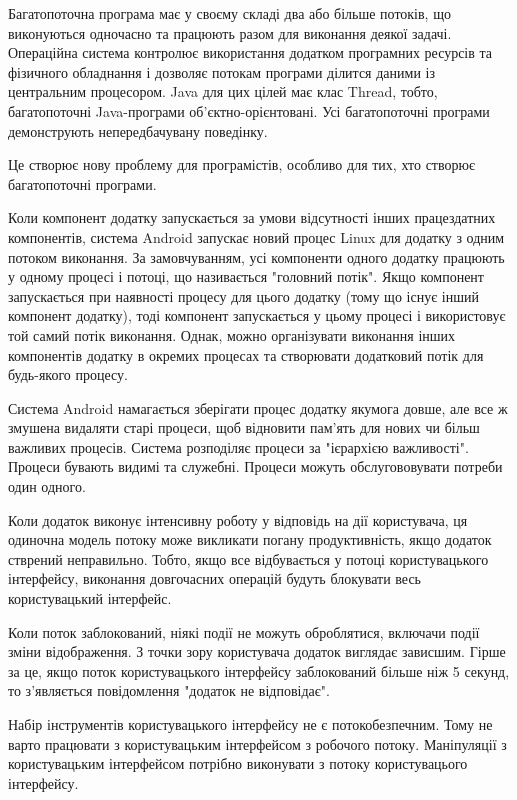 Багатопоточна програма має у своєму складі два або більше потоків, що виконуються одночасно та працюють разом для виконання деякої задачі. Операційна система контролює використання додатком програмних ресурсів та фізичного обладнання і дозволяє потокам програми ділится даними із центральним процесором. Java для цих цілей має клас Thread, тобто, багатопоточні Java-програми об'єктно-орієнтовані. Усі багатопоточні програми демонструють непередбачувану поведінку.

Це створює нову проблему для програмістів, особливо для тих, хто створює багатопоточні програми. \cite{carver2005modern}

Коли компонент додатку запускається за умови відсутності інших працездатних компонентів, система Android запускає новий процес Linux для додатку з одним потоком виконання. За замовчуванням, усі компоненти одного додатку працюють у одному процесі і потоці, що називається "головний потік". Якщо компонент запускається при наявності процесу для цього додатку (тому що існує інший компонент додатку), тоді компонент запускається у цьому процесі і використовує той самий потік виконання. Однак, можно організувати виконання інших компонентів додатку в окремих процесах та створювати додатковий потік для будь-якого процесу.

Система Android намагається зберігати процес додатку якумога довше, але все ж змушена видаляти старі процеси, щоб відновити пам'ять для нових чи більш важливих процесів. Система розподіляє процеси за "ієрархією важливості". Процеси бувають видимі та служебні. Процеси можуть обслугововувати потреби один одного.

Коли додаток виконує інтенсивну роботу у відповідь на дії користувача, ця одиночна модель потоку може викликати погану продуктивність, якщо додаток стврений неправильно. Тобто, якщо все відбувається у потоці користувацького інтерфейсу, виконання довгочасних операцій будуть блокувати весь користувацький інтерфейс.

Коли поток заблокований, ніякі події не можуть оброблятися, включачи події зміни відображення. З точки зору користувача додаток виглядає зависшим. Гірше за це, якщо поток користувацького інтерфейсу заблокований більше ніж 5 секунд, то з'являється повідомлення "додаток не відповідає".

Набір інструментів користувацького інтерфейсу не є потокобезпечним. Тому не варто працювати з користувацьким інтерфейсом з робочого потоку. Маніпуляції з користувацьким інтерфейсом потрібно виконувати з потоку користувацього інтерфейсу. 

